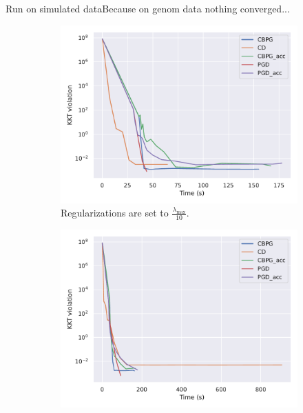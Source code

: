\documentclass[10pt,aspectratio=43]{beamer}
\begin{document}

\begin{frame}{Run on simulated data}{Because on genom data nothing converged...}
    \begin{figure}[ht!]
        \begin{subfigure}{.4\paperwidth}
            \centering
            \includegraphics[width=\textwidth]{prebuilt_images/simulated_n20000p500_kkt_snr10.pdf}
            \caption{Regularizations are set to $\frac{\lambda_{\max}}{10}$.}
            \label{fig:simu_ccl}
        \end{subfigure}
        \begin{subfigure}{.4\paperwidth}
            \centering
            \includegraphics[width=\textwidth]{prebuilt_images/simulated_n20000p500_kkt_snr10_over100.pdf}

\end{subfigure}
\end{figure}
\end{frame}
\end{document}
